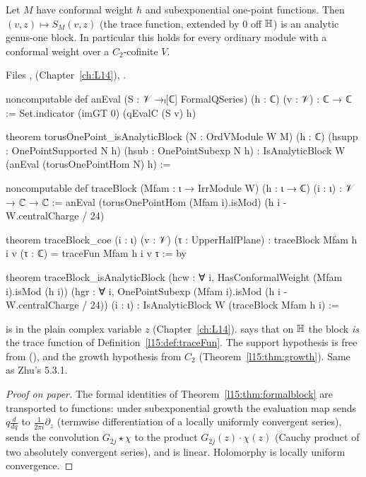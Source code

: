 \begin{theorem}\label{l15:thm:traceblock}
Let $M$ have conformal weight $h$ and subexponential one-point functions. Then $(v,z)\mapsto S_M(v,z)$ (the trace
function, extended by $0$ off $\mathbb{H}$) is an analytic genus-one block. In particular this holds for every ordinary
module with a conformal weight over a $C_2$-cofinite $V$.
\end{theorem}
\noindent Files ,
 (Chapter~\ref{ch:L14}),
.
\begin{leancode}
noncomputable def anEval (S : 𝒱 →ₗ[ℂ] FormalQSeries) (h : ℂ) (v : 𝒱) : ℂ → ℂ :=
  Set.indicator (imGT 0) (qEvalC (S v) h)

theorem torusOnePoint_isAnalyticBlock (N : OrdVModule W M) (h : ℂ)
    (hsupp : OnePointSupported N h) (hsub : OnePointSubexp N h) :
    IsAnalyticBlock W (anEval (torusOnePointHom N) h) :=

noncomputable def traceBlock (Mfam : ι → IrrModule W) (h : ι → ℂ) (i : ι) : 𝒱 → ℂ → ℂ :=
  anEval (torusOnePointHom (Mfam i).isMod) (h i - W.centralCharge / 24)

theorem traceBlock_coe (i : ι) (v : 𝒱) (τ : UpperHalfPlane) :
    traceBlock Mfam h i v (τ : ℂ) = traceFun Mfam h i v τ := by

theorem traceBlock_isAnalyticBlock
    (hcw : ∀ i, HasConformalWeight (Mfam i).isMod (h i))
    (hgr : ∀ i, OnePointSubexp (Mfam i).isMod (h i - W.centralCharge / 24)) (i : ι) :
    IsAnalyticBlock W (traceBlock Mfam h i) :=
\end{leancode}

\begin{dictionary}
 is  in the plain complex variable $z$ (Chapter~\ref{ch:L14}). 
says that on $\mathbb{H}$ the block \emph{is} the trace function  of Definition~\ref{l15:def:traceFun}. The
support hypothesis is free from  (\allowbreak{}), and the growth
hypothesis from $C_2$ (Theorem~\ref{l15:thm:growth}). Same as Zhu's 5.3.1.
\end{dictionary}

\begin{proof}[Proof on paper]
The formal identities of Theorem~\ref{l15:thm:formalblock} are transported to functions: under subexponential growth
the evaluation map sends $q\frac d{dq}$ to $\frac1{2\pi i}\partial_z$ (termwise differentiation of a locally uniformly
convergent series), sends the convolution $G_{2j}\star\chi$ to the product $G_{2j}(z)\cdot\chi(z)$ (Cauchy product of
two absolutely convergent series), and is linear. Holomorphy is locally uniform convergence.
\end{proof}

